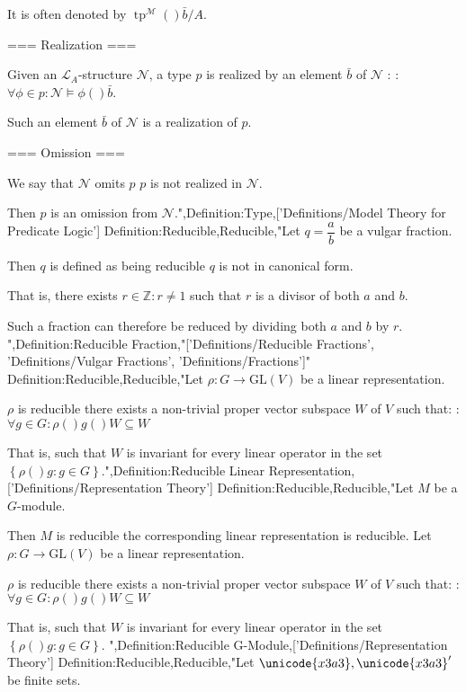 It is often denoted by $\operatorname {tp}^\mathcal M \left(   \right){\bar b / A}$.


=== Realization ===

Given an $\mathcal L_A$-structure $\mathcal N$, a type $p$ is realized by an element $\bar b$ of $\mathcal N$ :
:$\forall \phi \in p: \mathcal N \models \phi \left(   \right){\bar b}$.

Such an element $\bar b$ of $\mathcal N$ is a realization of $p$.


=== Omission ===

We say that $\mathcal N$ omits $p$  $p$ is not realized in $\mathcal N$.

Then $p$ is an omission from $\mathcal N$.",Definition:Type,['Definitions/Model Theory for Predicate Logic']
Definition:Reducible,Reducible,"Let $q = \dfrac a b$ be a vulgar fraction.

Then $q$ is defined as being reducible  $q$ is not in canonical form.

That is,  there exists $r \in \mathbb Z: r \ne 1$ such that $r$ is a divisor of both $a$ and $b$.

Such a fraction can therefore be reduced by dividing both $a$ and $b$ by $r$.
",Definition:Reducible Fraction,"['Definitions/Reducible Fractions', 'Definitions/Vulgar Fractions', 'Definitions/Fractions']"
Definition:Reducible,Reducible,"Let $\rho: G \to \mathrm {GL} \left( V \right)$ be a linear representation.


$\rho$ is reducible  there exists a non-trivial proper vector subspace $W$ of $V$ such that:
:$\forall g \in G: \rho \left(   \right)g \left(   \right)W \subseteq W$


That is, such that $W$ is invariant for every linear operator in the set $\left\lbrace \rho \left(   \right)g: g \in G \right\rbrace$.",Definition:Reducible Linear Representation,['Definitions/Representation Theory']
Definition:Reducible,Reducible,"Let $M$ be a $G$-module.

Then $M$ is reducible  the corresponding linear representation is reducible.
Let $\rho: G \to \mathrm {GL} \left( V \right)$ be a linear representation.


$\rho$ is reducible  there exists a non-trivial proper vector subspace $W$ of $V$ such that:
:$\forall g \in G: \rho \left(   \right)g \left(   \right)W \subseteq W$


That is, such that $W$ is invariant for every linear operator in the set $\left\lbrace \rho \left(   \right)g: g \in G \right\rbrace$.
",Definition:Reducible G-Module,['Definitions/Representation Theory']
Definition:Reducible,Reducible,"Let $\unicode{x3a3}, \unicode{x3a3}'$ be finite sets.

